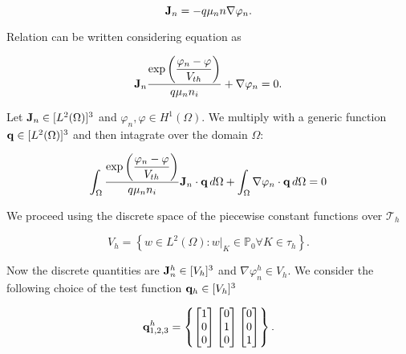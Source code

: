 \begin{equation}
\label{eq: current density fermi}
\mathbf{J}_n=-q \mu_n n \nabla \varphi_n.
\end{equation}

Relation  can be written considering equation  as

\begin{equation}
\label{eq: current density canonic form}
\mathbf{J}_n\dfrac{ \exp\left(\dfrac{\varphi_n-\varphi}{V_{th}}\right)}{q \mu_n n_i} + \nabla \varphi_n = 0.
\end{equation}

Let $\mathbf{J}_n\in[L^2(\Omega)]^3$ and $\varphi_n,\varphi \in H^1(\Omega)$. We multiply  with a generic function $\mathbf{q}\in[L^2(\Omega)]^3$ and then intagrate over the domain $\Omega$:

\begin{equation}
\label{eq: variation form of current density continuos}
\int_\Omega \dfrac{ \exp \left( \dfrac{\varphi_n-\varphi}{V_{th}} \right) }{q \mu_n n_i} \mathbf{J}_n \cdot \mathbf{q} \, d\Omega
 + \int_\Omega \nabla \varphi_n \cdot \mathbf{q} \, d\Omega = 0 
\end{equation}


We proceed using the discrete space of the piecewise constant functions over $\mathcal{T}_h$

\begin{equation}
\label{eq: spaces elementwise constant}
V_h=\left\{ w \in L^2(\Omega) : w|_{K}\in \mathbb{P}_0 \forall K \in \tau_h\right\}.
\end{equation}

Now the discrete quantities are $\mathbf{J}_n^h\in[V_h]^3$ and $\nabla \varphi_n^h \in V_h$. We consider the following choice of the test function $\mathbf{q}_h \in [V_h]^3$

\begin{equation}
\label{eq: form of qh}
\mathbf{q}^h_{1,2,3} = \left\{ \begin{bmatrix} 1 \\ 0 \\ 0 \end{bmatrix}  \begin{bmatrix} 0 \\ 1 \\ 0 \end{bmatrix}  \begin{bmatrix} 0 \\ 0 \\ 1 \end{bmatrix}  \right\}.
\end{equation}

